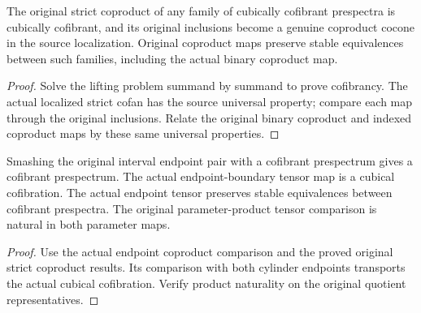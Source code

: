 \begin{proposition}
  \label{prop:actual-cofibrant-strict-coproducts}
  \leanok
  The original strict coproduct of any family of cubically cofibrant prespectra is cubically cofibrant, and its original inclusions become a genuine coproduct cocone in the source localization. Original coproduct maps preserve stable equivalences between such families, including the actual binary coproduct map.
\end{proposition}
\begin{proof}
  Solve the lifting problem summand by summand to prove cofibrancy. The actual localized strict cofan has the source universal property; compare each map through the original inclusions. Relate the original binary coproduct and indexed coproduct maps by these same universal properties.
  \leanok
\end{proof}

\begin{proposition}
  \label{prop:actual-endpoint-tensor-cofibrations}
  \leanok
  Smashing the original interval endpoint pair with a cofibrant prespectrum gives a cofibrant prespectrum. The actual endpoint-boundary tensor map is a cubical cofibration. The actual endpoint tensor preserves stable equivalences between cofibrant prespectra. The original parameter-product tensor comparison is natural in both parameter maps.
\end{proposition}
\begin{proof}
  Use the actual endpoint coproduct comparison and the proved original strict coproduct results. Its comparison with both cylinder endpoints transports the actual cubical cofibration. Verify product naturality on the original quotient representatives.
  \leanok
\end{proof}

